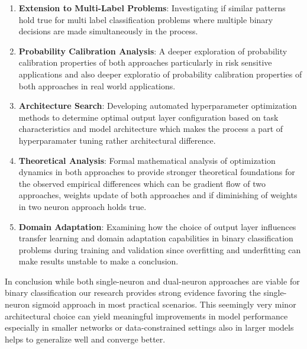 \begin{enumerate}
\item \textbf{Extension to Multi-Label Problems}: Investigating if similar patterns hold true for multi label classification problems where multiple binary decisions are made simultaneously in the process.

\item \textbf{Probability Calibration Analysis}: A deeper exploration of probability calibration properties of both approaches particularly in risk sensitive applications and also deeper exploratio of probability calibration properties of both approaches in real world applications.

\item \textbf{Architecture Search}: Developing automated hyperparameter optimization methods to determine optimal output layer configuration based on task characteristics and model architecture which makes the process a part of hyperparamater tuning rather architectural difference.

\item \textbf{Theoretical Analysis}: Formal mathematical analysis of optimization dynamics in both approaches to provide stronger theoretical foundations for the observed empirical differences which can be gradient flow of two approaches, weights update of both approaches and if diminishing of weights in two neuron approach holds true.

\item \textbf{Domain Adaptation}: Examining how the choice of output layer influences transfer learning and domain adaptation capabilities in binary classification problems during training and validation since overfitting and underfitting can make results unstable to make a conclusion.
\end{enumerate}

In conclusion while both single-neuron and dual-neuron approaches are viable for binary classification our research provides strong evidence favoring the single-neuron sigmoid approach in most practical scenarios. This seemingly very minor architectural choice can yield meaningful improvements in model performance especially in smaller networks or data-constrained settings also in larger models helps to generalize well and converge better.
